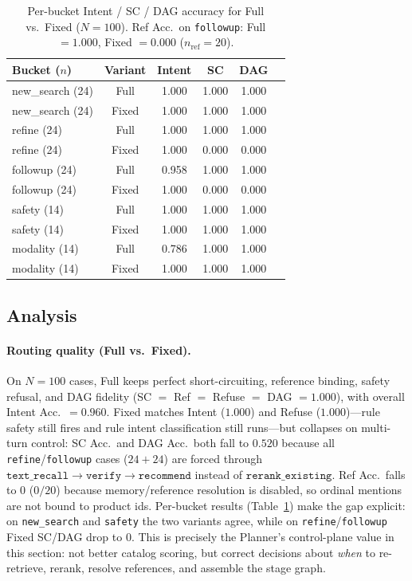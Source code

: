 \begin{table}[t]
  \centering
  \caption{Per-bucket Intent / SC / DAG accuracy for Full vs.\ Fixed ($N=100$).
  Ref Acc.\ on \texttt{followup}: Full $=1.000$, Fixed $=0.000$ ($n_{\mathrm{ref}}=20$).}
  \label{tab:planner-routing-bucket}
  \begin{tabular}{lccccc}
    \toprule
    Bucket ($n$) & Variant & Intent & SC & DAG \\
    \midrule
    new\_search (24) & Full  & 1.000 & 1.000 & 1.000 \\
    new\_search (24) & Fixed & 1.000 & 1.000 & 1.000 \\
    refine (24)      & Full  & 1.000 & 1.000 & 1.000 \\
    refine (24)      & Fixed & 1.000 & 0.000 & 0.000 \\
    followup (24)    & Full  & 0.958 & 1.000 & 1.000 \\
    followup (24)    & Fixed & 1.000 & 0.000 & 0.000 \\
    safety (14)      & Full  & 1.000 & 1.000 & 1.000 \\
    safety (14)      & Fixed & 1.000 & 1.000 & 1.000 \\
    modality (14)    & Full  & 0.786 & 1.000 & 1.000 \\
    modality (14)    & Fixed & 1.000 & 1.000 & 1.000 \\
    \bottomrule
  \end{tabular}
\end{table}

\subsection{Analysis}
\paragraph{Routing quality (Full vs.\ Fixed).}
On $N{=}100$ cases, Full keeps perfect short-circuiting, reference binding, safety refusal, and DAG fidelity
(SC $=$ Ref $=$ Refuse $=$ DAG $=1.000$), with overall Intent Acc.\ $=0.960$.
Fixed matches Intent ($1.000$) and Refuse ($1.000$)---rule safety still fires and rule intent classification still runs---but collapses on multi-turn control:
SC Acc.\ and DAG Acc.\ both fall to $0.520$ because all \texttt{refine}/\texttt{followup} cases
($24{+}24$) are forced through
$\texttt{text\_recall}\!\rightarrow\!\texttt{verify}\!\rightarrow\!\texttt{recommend}$
instead of $\texttt{rerank\_existing}$.
Ref Acc.\ falls to $0$ ($0/20$) because memory/reference resolution is disabled, so ordinal mentions are not bound to product ids.
Per-bucket results (Table~\ref{tab:planner-routing-bucket}) make the gap explicit:
on \texttt{new\_search} and \texttt{safety} the two variants agree, while on \texttt{refine}/\texttt{followup} Fixed SC/DAG drop to $0$.
This is precisely the Planner's control-plane value in this section: not better catalog scoring, but correct decisions about \emph{when} to re-retrieve, rerank, resolve references, and assemble the stage graph.


